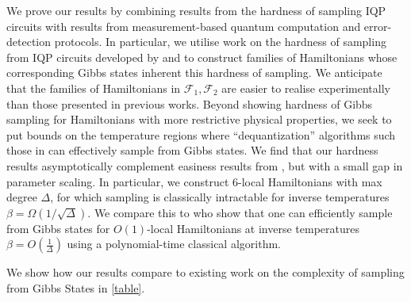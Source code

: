 \documentclass[a4paper,onecolumn,11pt,accepted=2017-05-09]{quantumarticle}
\begin{document}
    \noindent We prove our results by combining results from the hardness of sampling IQP circuits with results from measurement-based quantum computation and error-detection protocols.
    In particular, we utilise work on the hardness of sampling from IQP circuits developed by \citeauthor{fujii2016computational} \cite{fujii2016computational} and \citeauthor{Bremner_2017} \cite{Bremner_2017} to construct families of Hamiltonians whose corresponding Gibbs states inherent this hardness of sampling.
    We anticipate that the families of Hamiltonians in $\mathcal{F}_1,\mathcal{F}_2$ are easier to realise experimentally than those presented in previous works.
\iffalse
    Beyond showing hardness of Gibbs sampling for Hamiltonians with more restrictive physical properties, we seek to put bounds on the temperature regions where ``dequantization'' algorithms such those in \cite{bakshi2024high} can effectively sample from Gibbs states. We find that our hardness results asymptotically complement easiness results from \cite{bakshi2024high}, but with a small gap in parameter scaling.
    In particular, we construct $6$-local Hamiltonians with max degree $\Delta$, for which sampling is classically intractable for inverse temperatures $\beta = \Omega(1/\sqrt{\Delta})$.
    We compare this to \citeauthor{bakshi2024high} \cite[Theorem 1.6]{bakshi2024high} who show that one can efficiently sample from Gibbs states for $O(1)$-local Hamiltonians at inverse temperatures $\beta = O\left(\frac{1}{\Delta}\right)$ using a polynomial-time classical algorithm. 

    We show how our results compare to existing work on the complexity of sampling from Gibbs States in \cref{table}.
\end{document}
